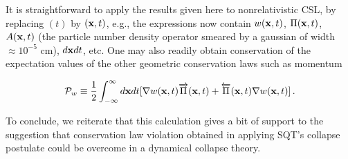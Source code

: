 \documentclass[12pt]{article}
\begin{document}
	It is straightforward to apply the results given here to nonrelativistic CSL, 
by replacing $(t)$ by $({\bf x},t)$, e.g., the expressions now contain 
$w({\bf x},t)$, $\Pi({\bf x},t)$, 
$A({\bf x},t)$ (the particle number density operator smeared by a gaussian of width 
$\approx 10^{-5}$ cm), $d{\bf x}dt$, etc. One may also readily obtain conservation of the 
expectation values of the other geometric conservation laws such as momentum

\begin{displaymath}
{\cal P}_{w}\equiv \frac{1}{2}\int_{-\infty}^{\infty}d{\bf x}dt
[{\bf \nabla}w({\bf x},t)\overrightarrow{\Pi}({\bf x},t)+
\overleftarrow{\Pi}({\bf x},t){\bf \nabla}w({\bf x},t)]\,.
\end{displaymath} 

	To conclude, we reiterate that this calculation gives a bit of support to the 
suggestion that conservation law violation obtained in applying SQT's collapse 
postulate could be overcome in a dynamical collapse theory.  

\eject
\end{document}
